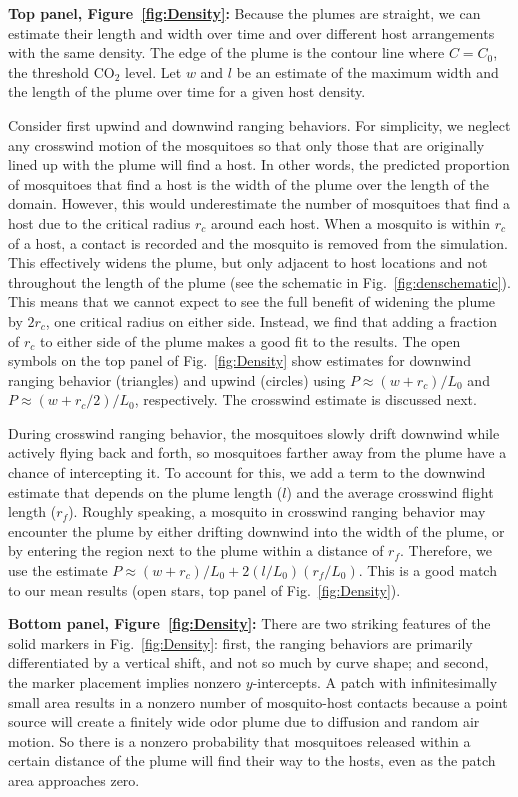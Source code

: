 \documentclass[12pt]{article}
\begin{document}
\textbf{Top panel, Figure~\ref{fig:Density}:} Because the plumes are straight, we can estimate their length and width over time and over different host arrangements with the same density. The edge of the plume is the contour line where $C = C_0$, the threshold CO$_2$ level. Let $w$ and $l$ be an estimate of the maximum width and the length of the plume over time for a given host density.

Consider first upwind and downwind ranging behaviors. For simplicity, we neglect any crosswind motion of the mosquitoes so that only those  that are originally lined up with the plume will find a host. In other words, the predicted proportion of mosquitoes that find a host is the width of the plume over the length of the domain. However, this would underestimate the number of mosquitoes that find a host due to the critical radius $r_c$ around each host. When a mosquito is within $r_c$ of a host, a contact is recorded and the mosquito is removed from the simulation. This effectively widens the plume, but only adjacent to host locations and not throughout the length of the plume (see the schematic in Fig.~\ref{fig:denschematic}). This means that we cannot expect to see the full benefit of widening the plume by $2r_c$, one critical radius on either side. Instead, we find that adding a fraction of $r_c$ to either side of the plume makes a good fit to the results.
The open symbols on the top panel of Fig.~\ref{fig:Density} show estimates for downwind ranging behavior (triangles) and upwind (circles) using  $P \approx (w+r_c)/L_0$ and $P \approx (w+r_c/2)/L_0$, respectively.  The crosswind estimate is discussed next.


During crosswind ranging behavior, the mosquitoes slowly drift downwind while actively flying back and forth, so mosquitoes farther away from the plume have a chance of intercepting it. To account for this, we add a term to the downwind estimate that depends on the plume length ($l$) and the average crosswind flight length ($r_f$).  Roughly speaking, a mosquito in crosswind ranging behavior may encounter the plume by either drifting downwind into the width of the plume, or by entering the region next to the plume within a distance of $r_f$. Therefore, we use the estimate $P \approx (w+r_c)/L_0 + 2(l/L_0)(r_f/L_0)$. This is a good match to our mean results (open stars, top panel of Fig.~\ref{fig:Density}).


\textbf{Bottom panel, Figure~\ref{fig:Density}:} There are two striking features of the solid markers in Fig.~\ref{fig:Density}: first, the ranging behaviors are primarily differentiated by a vertical shift, and not so much by curve shape; and second, the marker placement implies nonzero $y$-intercepts.
A patch with infinitesimally small area results in a nonzero number of mosquito-host contacts because a point source will create a finitely wide odor plume due to diffusion and random air motion. So there is a nonzero probability that mosquitoes released within a certain distance of the plume will find their way to the hosts, even as the patch area approaches zero.
\end{document}
